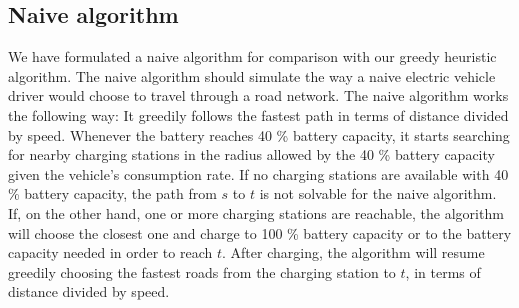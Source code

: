 \subsection{Naive algorithm}
\label{sub:naivealgorithm}
We have formulated a naive algorithm for comparison with our greedy heuristic algorithm. The naive algorithm should simulate the way a naive electric vehicle driver would choose to travel through a road network. The naive algorithm works the following way: It greedily follows the fastest path in terms of distance divided by speed. Whenever the battery reaches 40 \% battery capacity, it starts searching for nearby charging stations in the radius allowed by the 40 \% battery capacity given the vehicle's consumption rate. If no charging stations are available with 40 \% battery capacity, the path from $s$ to $t$ is not solvable for the naive algorithm. If, on the other hand, one or more charging stations are reachable, the algorithm will choose the closest one and charge to 100 \% battery capacity or to the battery capacity needed in order to reach $t$. After charging, the algorithm will resume greedily choosing the fastest roads from the charging station to $t$, in terms of distance divided by speed.